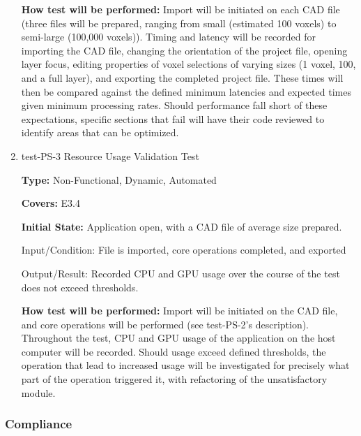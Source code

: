 \documentclass[12pt, titlepage]{article}
\begin{document}
\begin{enumerate}
\textbf{How test will be performed:} Import will be initiated on each CAD file (three files will be prepared, ranging from small (estimated 100 voxels)
to semi-large (100,000 voxels)). Timing and latency will be recorded for importing the CAD file, changing the orientation of the 
project file, opening layer focus, editing properties of voxel selections of varying sizes (1 voxel, 100, and a full layer), and exporting
the completed project file. These times will then be compared against the defined minimum latencies and expected times given minimum processing
rates. Should performance fall short of these expectations, specific sections that fail will have their code reviewed to identify areas 
that can be optimized. %

\item{test-PS-3 Resource Usage Validation Test\\}

\textbf{Type:} Non-Functional, Dynamic, Automated

\textbf{Covers:} E3.4 %
					
\textbf{Initial State:} Application open, with a CAD file of average size prepared.
					
Input/Condition: File is imported, core operations completed, and exported
					
Output/Result: Recorded CPU and GPU usage over the course of the test does not exceed thresholds. %
					
\textbf{How test will be performed:} Import will be initiated on the CAD file, and core operations will be performed (see test-PS-2's description). 
Throughout the test, CPU and GPU usage of the application on the host computer will be recorded. Should usage exceed defined thresholds, the operation
that lead to increased usage will be investigated for precisely what part of the operation triggered it, with refactoring of the unsatisfactory module.

\end{enumerate}

\subsubsection{Compliance}
\end{document}
